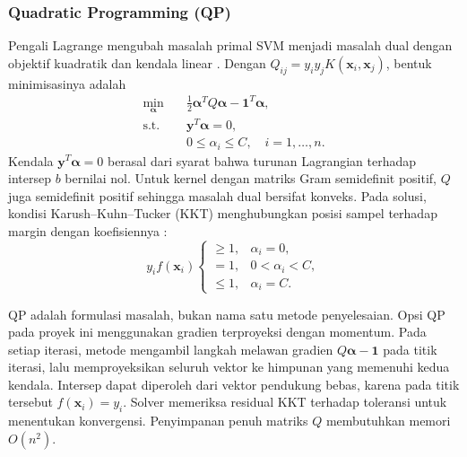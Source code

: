 \subsubsection{Quadratic Programming (QP)}
\label{sec:svm-qp}
Pengali Lagrange mengubah masalah primal SVM menjadi masalah dual dengan
objektif kuadratik dan kendala linear \cite[salindia~24--26 dan~38--40]{ref:materi-12}.
Dengan $Q_{ij}=y_i y_j K(\mathbf{x}_i,\mathbf{x}_j)$, bentuk minimisasinya
adalah
\begin{equation}
\begin{aligned}
\min_{\boldsymbol{\alpha}}\quad &\frac{1}{2}\boldsymbol{\alpha}^{T}Q\boldsymbol{\alpha}-\mathbf{1}^{T}\boldsymbol{\alpha},\\
\text{s.t.}\quad &\mathbf{y}^{T}\boldsymbol{\alpha}=0,\\
&0\leq\alpha_i\leq C,\quad i=1,\ldots,n.
\end{aligned}
\end{equation}
Kendala $\mathbf{y}^{T}\boldsymbol{\alpha}=0$ berasal dari syarat bahwa
turunan Lagrangian terhadap intersep $b$ bernilai nol. Untuk kernel dengan
matriks Gram semidefinit positif, $Q$ juga semidefinit positif sehingga
masalah dual bersifat konveks. Pada solusi, kondisi Karush--Kuhn--Tucker
(KKT) menghubungkan posisi sampel terhadap margin dengan koefisiennya
\cite[bagian~1.1]{ref:platt-1998}:
\[
y_i f(\mathbf{x}_i)
\begin{cases}
\geq 1, & \alpha_i=0,\\
=1, & 0<\alpha_i<C,\\
\leq 1, & \alpha_i=C.
\end{cases}
\]

QP adalah formulasi masalah, bukan nama satu metode penyelesaian. Opsi
QP pada proyek ini menggunakan gradien terproyeksi dengan momentum.
Pada setiap iterasi, metode mengambil langkah melawan gradien
$Q\boldsymbol{\alpha}-\mathbf{1}$ pada titik iterasi, lalu memproyeksikan
seluruh vektor ke himpunan yang memenuhi kedua kendala. Intersep dapat
diperoleh dari vektor pendukung bebas, karena pada titik tersebut
$f(\mathbf{x}_i)=y_i$. Solver memeriksa residual KKT terhadap toleransi
untuk menentukan konvergensi. Penyimpanan penuh matriks $Q$ membutuhkan
memori $O(n^2)$.

